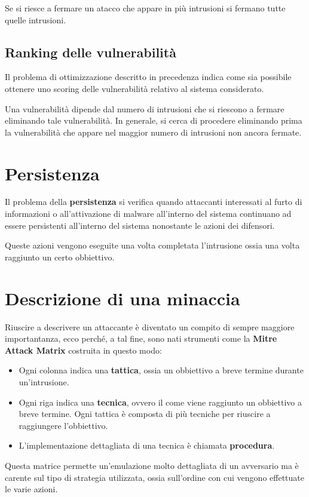 Se si riesce a fermare un atacco che appare in più intrusioni si fermano tutte quelle intrusioni.

\subsection{Ranking delle vulnerabilità}
Il problema di ottimizzazione descritto in precedenza indica come sia possibile ottenere uno scoring delle
vulnerabilità relativo al sistema considerato.

Una vulnerabilità dipende dal numero di intrusioni che si riescono a fermare eliminando tale vulnerabilità. In
generale, si cerca di procedere eliminando prima la vulnerabilità che appare nel maggior numero di intrusioni non
ancora fermate.

\section{Persistenza}
Il problema della \textbf{persistenza} si verifica quando attaccanti interessati al furto di informazioni o
all'attivazione di malware all'interno del sistema continuano ad essere persistenti all'interno del sistema nonostante
le azioni dei difensori.

Queste azioni vengono eseguite una volta completata l'intrusione ossia una volta raggiunto un certo obbiettivo.

\section{Descrizione di una minaccia}
Riuscire a descrivere un attaccante è diventato un compito di sempre maggiore importantanza, ecco perché, a tal fine,
sono nati strumenti come la \textbf{Mitre Attack Matrix} costruita in questo modo:
\begin{itemize}
	\item Ogni colonna indica una \textbf{tattica}, ossia un obbiettivo a breve termine durante un'intrusione.
	\item Ogni riga indica una \textbf{tecnica}, ovvero il come viene raggiunto un obbiettivo a breve termine. Ogni
	      tattica è composta di più tecniche per riuscire a raggiungere l'obbiettivo.
	\item L'implementazione dettagliata di una tecnica è chiamata \textbf{procedura}.
\end{itemize}
Questa matrice permette un'emulazione molto dettagliata di un avversario ma è carente sul tipo di strategia utilizzata,
ossia sull'ordine con cui vengono effettuate le varie azioni.


